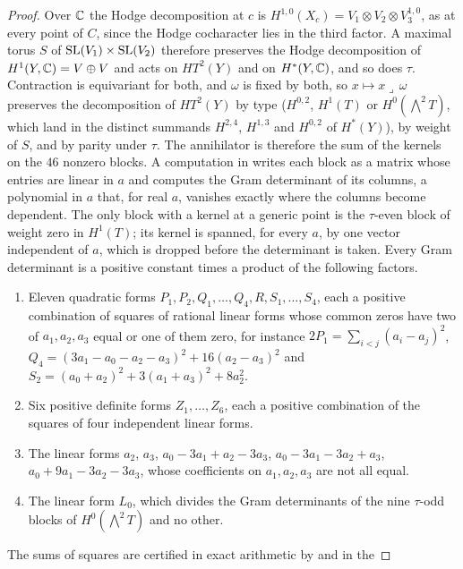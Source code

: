 \begin{proof}
Over $\mathbb{C}$ the Hodge decomposition at $c$ is
$H^{1,0}(X_{c})=V_{1}\otimes V_{2}\otimes V_{3}^{1,0}$, as at every point of
$C$, since the Hodge cocharacter lies in the third factor. A maximal torus
$S$ of $\operatorname{SL}(V_{1})\times\operatorname{SL}(V_{2})$ therefore preserves the Hodge
decomposition of $H^{1}(Y,\mathbb{C})=V\oplus V$ and acts on $HT^{2}(Y)$ and on
$H^{*}(Y,\mathbb{C})$, and so does $\tau$. Contraction is equivariant for both, and
$\omega$ is fixed by both, so $x\mapsto x\lrcorner\,\omega$ preserves the
decomposition of $HT^{2}(Y)$ by type ($H^{0,2}$, $H^{1}(T)$ or
$H^{0}(\bigwedge^{2}T)$, which land in the distinct summands $H^{2,4}$,
$H^{1,3}$ and $H^{0,2}$ of $H^{*}(Y)$), by weight of $S$, and by parity under
$\tau$. The annihilator is therefore the sum of the kernels on the $46$
nonzero blocks. A computation in \cite{BMB26} writes each block as a
matrix whose entries are linear in $a$ and computes the Gram determinant of
its columns, a polynomial in $a$ that, for real $a$, vanishes exactly where
the columns become dependent. The only block with a kernel at a generic point
is the $\tau$-even block of weight zero in $H^{1}(T)$; its kernel is spanned,
for every $a$, by one vector independent of $a$, which is dropped before the
determinant is taken. Every Gram determinant is a positive constant times a
product of the following factors.
\begin{enumerate}[label=\textup{(\alph*)},leftmargin=2.6em,itemsep=1pt]
\item Eleven quadratic forms $P_{1},P_{2},Q_{1},\dots,Q_{4},R,S_{1},\dots,
  S_{4}$, each a positive combination of squares of rational linear forms
  whose common zeros have two of $a_{1},a_{2},a_{3}$ equal or one of them
  zero, for instance
  $2P_{1}=\sum_{i<j}(a_{i}-a_{j})^{2}$,
  $Q_{4}=(3a_{1}-a_{0}-a_{2}-a_{3})^{2}+16(a_{2}-a_{3})^{2}$ and
  $S_{2}=(a_{0}+a_{2})^{2}+3(a_{1}+a_{3})^{2}+8a_{2}^{2}$.
\item Six positive definite forms $Z_{1},\dots,Z_{6}$, each a positive
  combination of the squares of four independent linear forms.
\item The linear forms $a_{2}$, $a_{3}$, $a_{0}-3a_{1}+a_{2}-3a_{3}$,
  $a_{0}-3a_{1}-3a_{2}+a_{3}$, $a_{0}+9a_{1}-3a_{2}-3a_{3}$, whose
  coefficients on $a_{1},a_{2},a_{3}$ are not all equal.
\item The linear form $L_{0}$, which divides the Gram determinants of the
  nine $\tau$-odd blocks of $H^{0}(\bigwedge^{2}T)$ and no other.
\end{enumerate}
The sums of squares are certified in exact arithmetic by \cite{BMB26} and in the

\end{proof}
